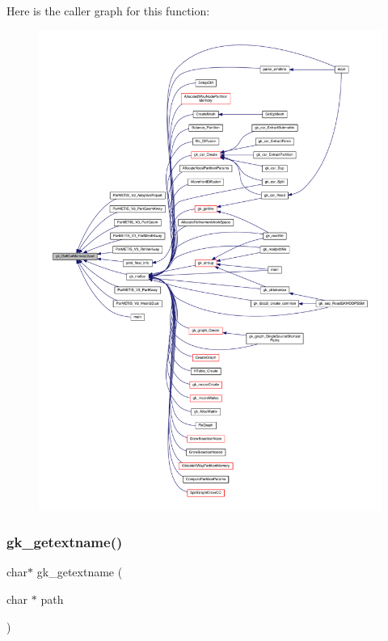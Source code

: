 Here is the caller graph for this function\+:\nopagebreak
\begin{figure}[H]
\begin{center}
\leavevmode
\includegraphics[width=350pt]{a00077_ad2327b94227019b6753b6b09400c0522_icgraph}
\end{center}
\end{figure}
\mbox{\label{a00077_a4d728cd9869792eb93b315f949819d99}} 
\subsubsection{\texorpdfstring{gk\+\_\+getextname()}{gk\_getextname()}}
{\footnotesize\ttfamily char$\ast$ gk\+\_\+getextname (\begin{DoxyParamCaption}\item[{char $\ast$}]{path }\end{DoxyParamCaption})}

